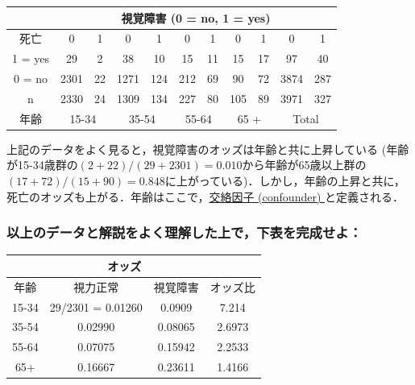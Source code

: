 \documentclass[11pt,]{problemset}
\begin{document}
\begin{center}
\begin{tabular}{|c|c|c|c|c|c|c|c|c|c|c|}
\hline
       & \multicolumn{10}{c|}{視覚障害 (0 = no, 1 = yes)}                                                                                                  \\ \hline
死亡     & 0             & 1          & 0            & 1           & 0            & 1           & 0           & 1           & 0            & 1           \\ \hline
1 = yes & 29            & 2          & 38           & 10          & 15           & 11          & 15          & 17          & 97           & 40          \\ \hline
0 = no & 2301          & 22         & 1271         & 124         & 212          & 69          & 90          & 72          & 3874         & 287         \\ \hline
  n     & 2330          &  24         & 1309         & 134         & 227          & 80          & 105          & 89          & 3971         & 327         \\ \hline
年齢     & \multicolumn{2}{c|}{15-34} & \multicolumn{2}{c|}{35-54} & \multicolumn{2}{c|}{55-64} & \multicolumn{2}{c|}{65 +} & \multicolumn{2}{c|}{Total} \\ \hline
\end{tabular}
\end{center}

上記のデータをよく見ると，視覚障害のオッズは年齢と共に上昇している
(年齢が15-34歳群の\((2 + 22) / (29 + 2301) = 0.010\)から年齢が65歳以上群の\((17+72)/(15+90) = 0.848\)に上がっている)．しかし，年齢の上昇と共に，死亡のオッズも上がる．年齢はここで，\underline{交絡因子 (confounder) }と定義される．

\subsubsection{以上のデータと解説をよく理解した上で，下表を完成せよ：}

\begin{center}
\begin{tabular}{|c|c|c|c|}
\hline
      & \multicolumn{2}{c|}{オッズ}    &        \\ \hline
年齢    & 視力正常              & 視覚障害    & オッズ比   \\ \hline
15-34 & 29/2301 = 0.01260 & 0.0909  & 7.214  \\ \hline
35-54 & 0.02990           & 0.08065 & 2.6973 \\ \hline
55-64 & 0.07075           & 0.15942 & 2.2533 \\ \hline
65+   & 0.16667           & 0.23611 & 1.4166 \\ \hline
\end{tabular}
\end{center}
\end{document}
